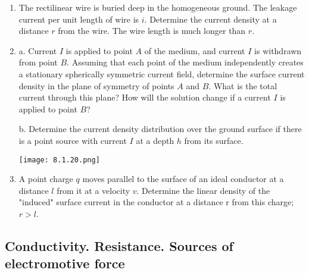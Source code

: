 \documentclass{article}
\begin{document}
\begin{enumerate}[label=8.1.\arabic*]
\item The rectilinear wire is buried deep in the homogeneous ground. The leakage current per unit length of wire is $i$. Determine the current density at a distance $r$ from the wire. The wire length is much longer than $r$.

\item a. Current $I$ is applied to point $A$ of the medium, and current $I$ is withdrawn from point $B$. Assuming that each point of the medium independently creates a stationary spherically symmetric current field, determine the surface current density in the plane of symmetry of points $A$ and $B$. What is the total current through this plane? How will the solution change if a current $I$ is applied to point $B$? 

b. Determine the current density distribution over the ground surface if there is a point source with current $I$ at a depth $h$ from its surface.

\begin{center}
    \texttt{[image: 8.1.20.png]}
\end{center}


\item A point charge $q$ moves parallel to the surface of an ideal conductor at a distance $l$ from it at a velocity $v$. Determine the linear density of the "induced" surface current in the conductor at a distance r from this charge; $r > l$.



\end{enumerate}
\subsection{Conductivity. Resistance. Sources of electromotive force}
\end{document}
